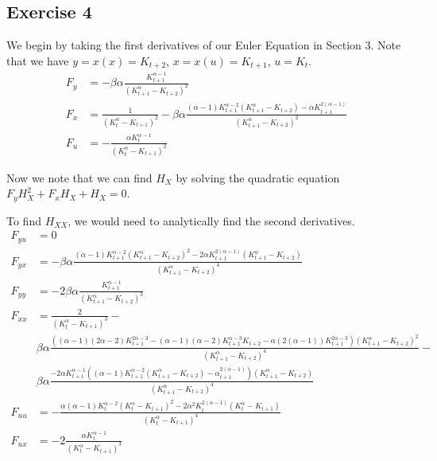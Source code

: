 \documentclass{article}
\begin{document}
	\newpage
	\subsection*{Exercise 4}
	We begin by taking the first derivatives of our Euler Equation in Section 3. Note that we have $y = x(x) = K_{t+2}$, $x = x(u) = K_{t+1}$, $u = K_t$.
	\begin{align*}
	F_y &= - \beta \alpha \frac{K_{t+1}^{\alpha -1}}{(K_{t+1}^{\alpha} - K_{t+2})^2} \\
	F_x &= \frac{1}{(K_{t}^\alpha - K_{t+1})^2} - \beta \alpha \frac{ (\alpha -1) K_{t+1}^{\alpha - 2} (K_{t+1}^{\alpha} - K_{t+2}) -\alpha K_{t+1}^{2(\alpha -1)}}{(K_{t+1}^{\alpha} - K_{t+2})^2} \\
	F_u &= - \frac{\alpha K_t^{\alpha -1}}{(K_t^{\alpha} - K_{t+1})^2} 
	\end{align*}
	
	Now we note that we can find $H_X$ by solving the quadratic equation $F_y H_X^2 + F_x H_X + H_X = 0$. 

	To find $H_{XX}$, we would need to analytically find the second derivatives.
	\begin{align*}
	F_{yu} &= 0 \\
	F_{yx} &= - \beta \alpha \frac{(\alpha -1)K_{t+1}^{\alpha -2} (K_{t+1}^{\alpha} - K_{t+2})^2 - 2 \alpha K_{t+1}^{2(\alpha -1)} (K_{t+1}^{\alpha} - K_{t+2}) }{(K_{t+1}^{\alpha} - K_{t+2})^4} \\
	F_{yy} &= - 2 \beta \alpha \frac{K_{t+1}^{\alpha -1}}{(K_{t+1}^{\alpha} - K_{t+2})^3} \\
	F_{xx} &= \frac{2}{(K_t^{\alpha} - K_{t+1})^3} - \\
	& \beta \alpha \frac{((\alpha -1)(2\alpha -2) K_{t+1}^{2\alpha -3} - (\alpha -1)(\alpha -2) K_{t+1}^{\alpha -3} K_{t+2} - \alpha (2(\alpha -1)) K_{t+1}^{2\alpha -3})(K_{t+1}^{\alpha} - K_{t+2})^2 }{(K_{t+1}^{\alpha} - K_{t+2})^4} - \\
	& \beta \alpha \frac{- 2\alpha K_{t+1}^{\alpha -1} ((\alpha -1)K_{t+1}^{\alpha -2}(K_{t+1}^{\alpha} - K_{t+2}) - \alpha _{t+1}^{2(\alpha -1)})(K_{t+1}^{\alpha} - K_{t+2})}{(K_{t+1}^{\alpha} - K_{t+2})^4}\\
	F_{uu} &=  - \frac{\alpha(\alpha -1) K_t^{\alpha -2} (K_t^{\alpha} - K_{t+1})^2 - 2 \alpha^2 K_{t}^{2(\alpha -1)}(K_{t}^{\alpha} - K_{t+1})}{(K_t^{\alpha} - K_{t+1})^4} \\
	F_{ux} &= - 2 \frac{\alpha K_{t}^{\alpha -1}}{(K_t^\alpha - K_{t+1})^3}
	\end{align*}
	
\end{document}

